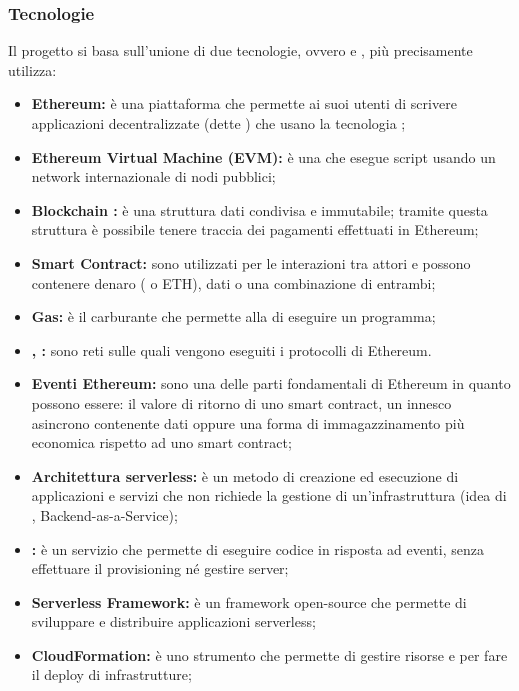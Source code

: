     \subsubsection{Tecnologie}
     Il progetto si basa sull'unione di due tecnologie, ovvero  e , più precisamente utilizza:
    		 \begin{itemize}
    			\item \textbf{Ethereum: }è una piattaforma che permette ai suoi utenti di scrivere applicazioni decentralizzate (dette ) che usano la tecnologia ;
    			\item \textbf{Ethereum Virtual Machine (EVM): }è una  che esegue script usando un network internazionale di nodi pubblici;
    			\item \textbf{Blockchain : }è una struttura dati condivisa e immutabile;  tramite questa struttura è possibile tenere traccia dei pagamenti effettuati in Ethereum;
    			\item \textbf{Smart Contract: }sono utilizzati per le interazioni tra attori e possono contenere denaro ( o ETH), dati o una combinazione di entrambi;
    			\item \textbf{Gas: }è il carburante che permette alla  di eseguire un programma;
    		 	\item \textbf{, : }sono reti sulle quali vengono eseguiti i protocolli di Ethereum. 
    		 	\item \textbf{Eventi Ethereum: }sono una delle parti fondamentali di Ethereum in quanto possono essere: il  valore di ritorno di uno smart contract,  un innesco asincrono contenente dati oppure una forma di  immagazzinamento più economica rispetto ad uno smart contract;
    			 \item \textbf{Architettura serverless: }è un metodo di creazione ed esecuzione di applicazioni e servizi che non richiede la gestione di un'infrastruttura (idea di , Backend-as-a-Service);
    		 	\item \textbf{: }è un servizio che permette di eseguire codice  in risposta ad eventi, senza effettuare il provisioning né gestire server;
    		 	\item \textbf{Serverless Framework: }è un framework open-source che permette di sviluppare e distribuire applicazioni serverless;
    		 	\item \textbf{CloudFormation: }è uno strumento che permette di gestire risorse e per fare il deploy di infrastrutture;

\end{itemize}
